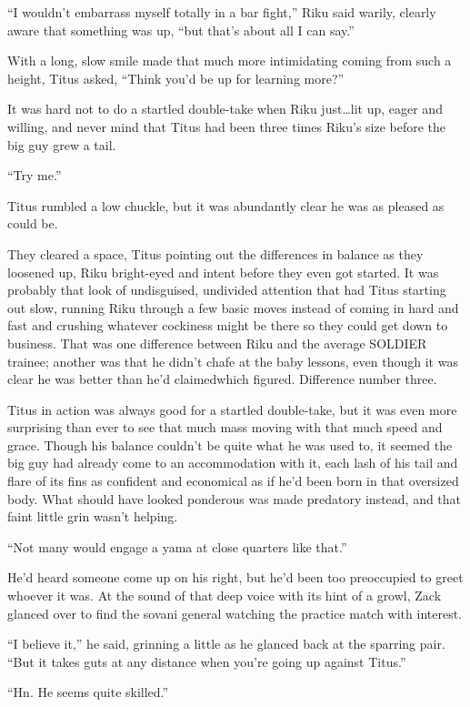 ``I wouldn't embarrass myself totally in a bar fight,'' Riku said warily, clearly aware that something was up, ``but that's about all I can say.''

With a long, slow smile made that much more intimidating coming from such a height, Titus asked, ``Think you'd be up for learning more?''

It was hard not to do a startled double-take when Riku just\ldots lit up, eager and willing, and never mind that Titus had been three times Riku's size before the big guy grew a tail.

``Try me.''

Titus rumbled a low chuckle, but it was abundantly clear he was as pleased as could be.

They cleared a space, Titus pointing out the differences in balance as they loosened up, Riku bright-eyed and intent before they even got started. It was probably that look of undisguised, undivided attention that had Titus starting out slow, running Riku through a few basic moves instead of coming in hard and fast and crushing whatever cockiness might be there so they could get down to business. That was one difference between Riku and the average SOLDIER trainee; another was that he didn't chafe at the baby lessons, even though it was clear he was better than he'd claimed\textemdash which figured. Difference number three.

Titus in action was always good for a startled double-take, but it was even more surprising than ever to see that much mass moving with that much speed and grace. Though his balance couldn't be quite what he was used to, it seemed the big guy had already come to an accommodation with it, each lash of his tail and flare of its fins as confident and economical as if he'd been born in that oversized body. What should have looked ponderous was made predatory instead, and that faint little grin wasn't helping.

``Not many would engage a yama at close quarters like that.''

He'd heard someone come up on his right, but he'd been too preoccupied to greet whoever it was. At the sound of that deep voice with its hint of a growl, Zack glanced over to find the sovani general watching the practice match with interest.

``I believe it,'' he said, grinning a little as he glanced back at the sparring pair. ``But it takes guts at any distance when you're going up against Titus.''

``Hn. He seems quite skilled.''

